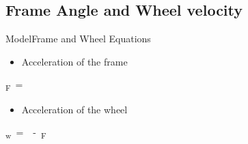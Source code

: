 \subsection{Frame Angle and Wheel velocity}
\begin{frame}{Model}{Frame and Wheel Equations}
	\begin{itemize}
		\item Acceleration of the frame
	\end{itemize}
\small
	\begin{flalign}
\si{\ddot{\theta}_F = } \nonumber
	\end{flalign}
	\vspace{0.5cm}
\normalsize	
%
\begin{itemize}
	\item Acceleration of the wheel
\end{itemize}
\small
	\begin{flalign}
\si{\ddot{\theta}_w =  - \ddot{\theta}_F} \nonumber
	\end{flalign}
\normalsize
	
\end{frame}

